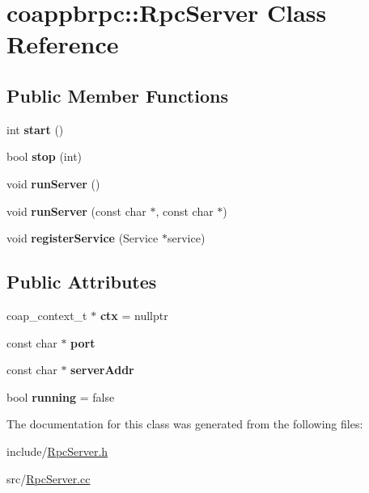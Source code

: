 \hypertarget{classcoappbrpc_1_1RpcServer}{}\section{coappbrpc\+:\+:Rpc\+Server Class Reference}
\label{classcoappbrpc_1_1RpcServer}
\subsection*{Public Member Functions}
\begin{DoxyCompactItemize}
\item 
\mbox{\label{classcoappbrpc_1_1RpcServer_a7658f607ecc19f8c05082363ffd5cd54}} 
int {\bfseries start} ()
\item 
\mbox{\label{classcoappbrpc_1_1RpcServer_a93a8e554d0e52b30b79ca8077f040bb2}} 
bool {\bfseries stop} (int)
\item 
\mbox{\label{classcoappbrpc_1_1RpcServer_a453e2eb88b54439a1ba249ee66ee912e}} 
void {\bfseries run\+Server} ()
\item 
\mbox{\label{classcoappbrpc_1_1RpcServer_ac1742b534bbb7c0b054c40346c876cf5}} 
void {\bfseries run\+Server} (const char $\ast$, const char $\ast$)
\item 
\mbox{\label{classcoappbrpc_1_1RpcServer_acc9877a9bfff6783aa0261942d2917c2}} 
void {\bfseries register\+Service} (Service $\ast$service)
\end{DoxyCompactItemize}
\subsection*{Public Attributes}
\begin{DoxyCompactItemize}
\item 
\mbox{\label{classcoappbrpc_1_1RpcServer_a34a0db66e265d8986dea6d9e360a7ca3}} 
coap\+\_\+context\+\_\+t $\ast$ {\bfseries ctx} = nullptr
\item 
\mbox{\label{classcoappbrpc_1_1RpcServer_a9fec802c5d77b168560d14b73fc988e1}} 
const char $\ast$ {\bfseries port}
\item 
\mbox{\label{classcoappbrpc_1_1RpcServer_a14953d39d8e53a7f3dcffde2d15734d0}} 
const char $\ast$ {\bfseries server\+Addr}
\item 
\mbox{\label{classcoappbrpc_1_1RpcServer_a5110ce6a1447e421359982aff15744e2}} 
bool {\bfseries running} = false
\end{DoxyCompactItemize}


The documentation for this class was generated from the following files\+:\begin{DoxyCompactItemize}
\item 
include/\hyperlink{RpcServer_8h}{Rpc\+Server.\+h}\item 
src/\hyperlink{RpcServer_8cc}{Rpc\+Server.\+cc}\end{DoxyCompactItemize}

